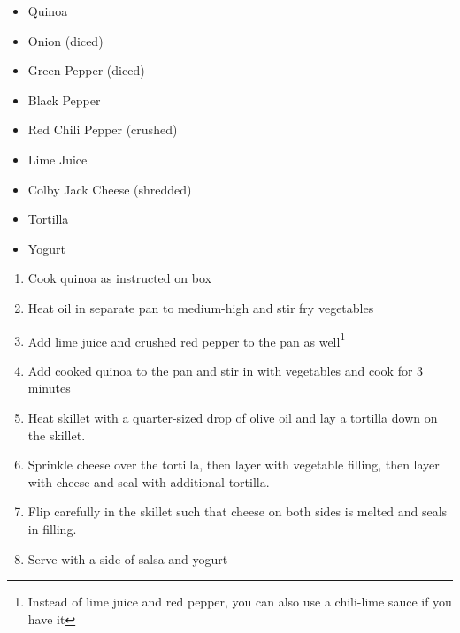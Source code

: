 \documentclass[oneside]{recipe}
\newcommand{\recipecolumn}[2]{
	\begin{multicols}{2}
	\raggedcolumns
	#1
	\columnbreak
	#2
	\end{multicols}
}
\begin{document}
\newpage
{}
\recipecolumn{
	\begin{itemize}
		\item Quinoa
		\item Onion (diced)
		\item Green Pepper (diced)
		\item Black Pepper
		\item Red Chili Pepper (crushed)
		\item Lime Juice
		\item Colby Jack Cheese (shredded)
		\item Tortilla
		\item Yogurt
	\end{itemize}

}{
	\begin{enumerate}
		\item Cook quinoa as instructed on box
		\item Heat oil in separate pan to medium-high and stir fry vegetables
		\item Add lime juice and crushed red pepper to the pan as well\footnote{Instead of lime juice and red pepper, you can also use a chili-lime sauce if you have it}
		\item Add cooked quinoa to the pan and stir in with vegetables and cook for 3 minutes
		\item Heat skillet with a quarter-sized drop of olive oil and lay a tortilla down on the skillet.
		\item Sprinkle cheese over the tortilla, then layer with vegetable filling, then layer with cheese and seal with additional tortilla. 
		\item Flip carefully in the skillet such that cheese on both sides is melted and seals in filling. 
		\item Serve with a side of salsa and yogurt
	\end{enumerate}
}
\end{document}
